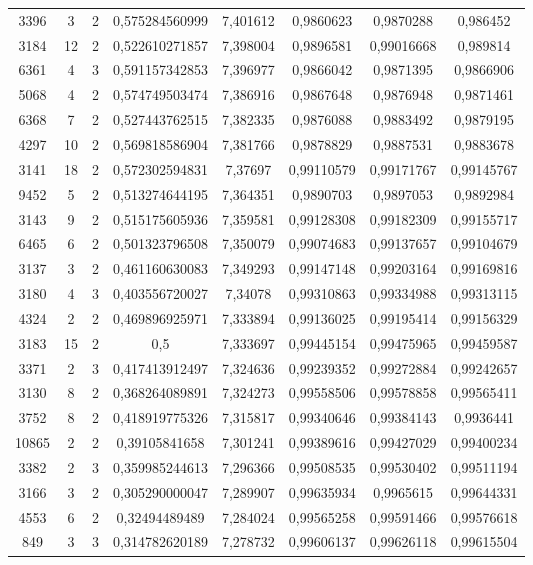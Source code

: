 \begin{longtable}{|c|c|c|c|c|c|c|c|}
3396 & 3 & 2 & 0,575284560999 & 7,401612 & 0,9860623 & 0,9870288 & 0,986452 \\
3184 & 12 & 2 & 0,522610271857 & 7,398004 & 0,9896581 & 0,99016668 & 0,989814 \\
6361 & 4 & 3 & 0,591157342853 & 7,396977 & 0,9866042 & 0,9871395 & 0,9866906 \\
5068 & 4 & 2 & 0,574749503474 & 7,386916 & 0,9867648 & 0,9876948 & 0,9871461 \\
6368 & 7 & 2 & 0,527443762515 & 7,382335 & 0,9876088 & 0,9883492 & 0,9879195 \\
4297 & 10 & 2 & 0,569818586904 & 7,381766 & 0,9878829 & 0,9887531 & 0,9883678 \\
3141 & 18 & 2 & 0,572302594831 & 7,37697 & 0,99110579 & 0,99171767 & 0,99145767 \\
9452 & 5 & 2 & 0,513274644195 & 7,364351 & 0,9890703 & 0,9897053 & 0,9892984 \\
3143 & 9 & 2 & 0,515175605936 & 7,359581 & 0,99128308 & 0,99182309 & 0,99155717 \\
6465 & 6 & 2 & 0,501323796508 & 7,350079 & 0,99074683 & 0,99137657 & 0,99104679 \\
3137 & 3 & 2 & 0,461160630083 & 7,349293 & 0,99147148 & 0,99203164 & 0,99169816 \\
3180 & 4 & 3 & 0,403556720027 & 7,34078 & 0,99310863 & 0,99334988 & 0,99313115 \\
4324 & 2 & 2 & 0,469896925971 & 7,333894 & 0,99136025 & 0,99195414 & 0,99156329 \\
3183 & 15 & 2 & 0,5 & 7,333697 & 0,99445154 & 0,99475965 & 0,99459587 \\
3371 & 2 & 3 & 0,417413912497 & 7,324636 & 0,99239352 & 0,99272884 & 0,99242657 \\
3130 & 8 & 2 & 0,368264089891 & 7,324273 & 0,99558506 & 0,99578858 & 0,99565411 \\
3752 & 8 & 2 & 0,418919775326 & 7,315817 & 0,99340646 & 0,99384143 & 0,9936441 \\
10865 & 2 & 2 & 0,39105841658 & 7,301241 & 0,99389616 & 0,99427029 & 0,99400234 \\
3382 & 2 & 3 & 0,359985244613 & 7,296366 & 0,99508535 & 0,99530402 & 0,99511194 \\
3166 & 3 & 2 & 0,305290000047 & 7,289907 & 0,99635934 & 0,9965615 & 0,99644331 \\
4553 & 6 & 2 & 0,32494489489 & 7,284024 & 0,99565258 & 0,99591466 & 0,99576618 \\
849 & 3 & 3 & 0,314782620189 & 7,278732 & 0,99606137 & 0,99626118 & 0,99615504 \\

\end{longtable}
